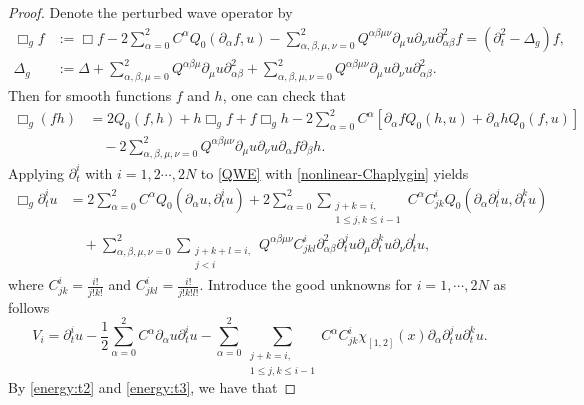 \documentclass[11pt,twoside]{article}
\def\p{\partial}
\theoremstyle{plain}
\theoremstyle{definition}
\numberwithin{equation}{section}
\begin{document}
\begin{proof}
Denote the perturbed wave operator by
\begin{equation}\label{energy:t1}
\begin{split}
\Box_gf&:=\Box f-2\sum_{\alpha=0}^2C^{\alpha}Q_0(\p_{\alpha}f,u)-\sum_{\alpha,\beta,\mu,\nu=0}^2Q^{\alpha\beta\mu\nu}\p_{\mu}u\p_{\nu}u\p^2_{\alpha\beta}f
=(\p_t^2-\Delta_g)f,\\
\Delta_g&:=\Delta+\sum_{\alpha,\beta,\mu=0}^2Q^{\alpha\beta\mu}\p_{\mu}u\p^2_{\alpha\beta}
+\sum_{\alpha,\beta,\mu,\nu=0}^2Q^{\alpha\beta\mu\nu}\p_{\mu}u\p_{\nu}u\p^2_{\alpha\beta}.
\end{split}
\end{equation}
Then for smooth functions $f$ and $h$, one can check that
\begin{equation}\label{energy:t2}
\begin{split}
\Box_g(fh)&=2Q_0(f,h)+h\Box_gf+f\Box_gh-2\sum_{\alpha=0}^2C^{\alpha}[\p_{\alpha}fQ_0(h,u)+\p_{\alpha}hQ_0(f,u)]\\
&\quad-2\sum_{\alpha,\beta,\mu,\nu=0}^2Q^{\alpha\beta\mu\nu}\p_{\mu}u\p_{\nu}u\p_{\alpha}f\p_{\beta}h.
\end{split}
\end{equation}
Applying $\p_t^i$ with $i=1,2\cdots,2N$ to \eqref{QWE} with \eqref{nonlinear-Chaplygin} yields
\begin{equation}\label{energy:t3}
\begin{split}
\Box_g\p_t^iu&=2\sum_{\alpha=0}^2C^{\alpha}Q_0(\p_{\alpha}u,\p_t^iu)
+2\sum_{\alpha=0}^2\sum_{\substack{j+k=i,\\1\le j,k\le i-1}}C^{\alpha}C^i_{jk}Q_0(\p_{\alpha}\p_t^ju,\p_t^ku)\\
&\quad+\sum_{\alpha,\beta,\mu,\nu=0}^2\sum_{\substack{j+k+l=i,\\ j<i}}Q^{\alpha\beta\mu\nu}C^i_{jkl}\p^2_{\alpha\beta}\p_t^ju\p_{\mu}\p_t^ku\p_{\nu}\p_t^lu,
\end{split}
\end{equation}
where $C^i_{jk}=\frac{i!}{j!k!}$ and $C^i_{jkl}=\frac{i!}{j!k!l!}$.
Introduce the good unknowns for $i=1,\cdots,2N$ as follows
\begin{equation}\label{energy:t4}
V_i=\p_t^iu-\frac12\sum_{\alpha=0}^2C^{\alpha}\p_{\alpha}u\p_t^iu
-\sum_{\alpha=0}^2\sum_{\substack{j+k=i,\\1\le j,k\le i-1}}C^{\alpha}C^i_{jk}\chi_{[1,2]}(x)\p_{\alpha}\p_t^ju\p_t^ku.
\end{equation}
By \eqref{energy:t2} and \eqref{energy:t3}, we have that

\end{proof}
\end{document}
